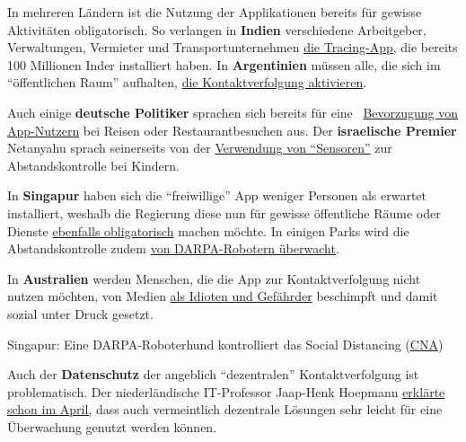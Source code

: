 In mehreren Ländern ist die Nutzung der Applikationen bereits für
gewisse Aktivitäten obligatorisch. So verlangen in \textbf{Indien}
verschiedene Arbeitgeber, Verwaltungen, Vermieter und
Transport­unter­nehmen
\href{https://www.technologyreview.com/2020/05/07/1001360/india-aarogya-setu-covid-app-mandatory/}{die
Tracing-App}, die bereits 100 Millionen Inder installiert haben. In
\textbf{Argentinien} müssen alle, die sich im ``öffentlichen Raum''
aufhalten,
\href{https://www.heise.de/tp/features/CuidAR-Argentinien-ueberwacht-mit-einer-App-4720143.html}{die
Kontaktverfolgung aktivieren}.

Auch einige \textbf{deutsche Politiker} sprachen sich bereits für eine~
\href{https://www.faz.net/aktuell/politik/wer-die-corona-app-hat-soll-zuerst-wieder-ins-restaurant-duerfen-16759932.html}{Bevorzugung
von App-Nutzern} bei Reisen oder Restaurantbesuchen aus. Der
\textbf{israelische Premier} Netanyahu sprach seinerseits von der
\href{https://norberthaering.de/die-regenten-der-welt/netanyahu-sensoren/}{Verwendung
von ``Sensoren''} zur Abstandskontrolle bei Kindern.

In \textbf{Singapur} haben sich die ``freiwillige'' App weniger Personen
als erwartet installiert, weshalb die Regierung diese nun für gewisse
öffentliche Räume oder Dienste
\href{https://www.letemps.ch/economie/singapour-tracage-app-degenere-surveillance-masse}{ebenfalls
obligatorisch} machen möchte. In einigen Parks wird die
Abstandskontrolle zudem
\href{https://www.youtube.com/watch?v=2DJmIjKtVkA}{von DARPA-Robotern
überwacht}.

In \textbf{Australien} werden Menschen, die die App zur
Kontaktverfolgung nicht nutzen möchten, von Medien
\href{https://www.news.com.au/world/coronavirus/australia/people-who-refuse-to-download-the-covidsafe-virus-tracing-app-are-the-new-antivaxxers/news-story/541c36fe5cdb56eb1a098b0b9a0dddcc}{als
Idioten und Gefährder} beschimpft und damit sozial unter Druck gesetzt.

Singapur: Eine DARPA-Roboterhund kontrolliert das Social Distancing
(\href{https://www.youtube.com/watch?v=2DJmIjKtVkA}{CNA})

Auch der \textbf{Datenschutz} der angeblich ``dezentralen''
Kontaktverfolgung ist problematisch. Der niederländische IT-Professor
Jaap-Henk Hoepmann
\href{http://blog.xot.nl/2020/04/11/stop-the-apple-and-google-contact-tracing-platform-or-be-ready-to-ditch-your-smartphone/}{erklärte
schon im April,} dass auch vermeintlich dezentrale Lösungen sehr leicht
für eine Überwachung genutzt werden können.

